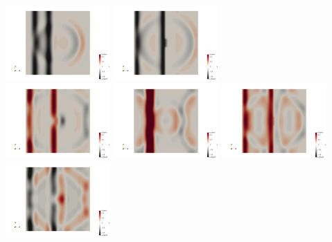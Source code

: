 \begin{center}
\includegraphics[width=4cm]{python_codes/fieldstone_165/results4/uu0300.png}
\includegraphics[width=4cm]{python_codes/fieldstone_165/results4/uu0350.png}\\
\includegraphics[width=4cm]{python_codes/fieldstone_165/results4/uu0400.png}
\includegraphics[width=4cm]{python_codes/fieldstone_165/results4/uu0500.png}
\includegraphics[width=4cm]{python_codes/fieldstone_165/results4/uu0600.png}
\includegraphics[width=4cm]{python_codes/fieldstone_165/results4/uu0650.png}
\end{center}

